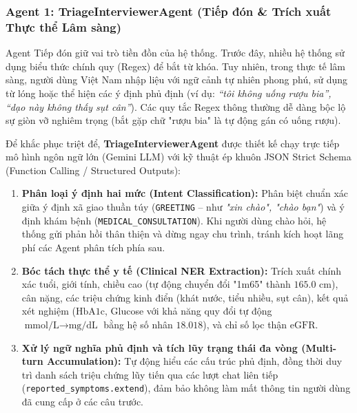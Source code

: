 \documentclass[12pt,a4paper]{article}
\begin{document}
\subsubsection{Agent 1: TriageInterviewerAgent (Tiếp đón \& Trích xuất Thực thể Lâm sàng)}
Agent Tiếp đón giữ vai trò tiền đồn của hệ thống. Trước đây, nhiều hệ thống sử dụng biểu thức chính quy (Regex) để bắt từ khóa. Tuy nhiên, trong thực tế lâm sàng, người dùng Việt Nam nhập liệu với ngữ cảnh tự nhiên phong phú, sử dụng từ lóng hoặc thể hiện các ý định phủ định (ví dụ: \textit{“tôi không uống rượu bia”, “dạo này không thấy sụt cân”}). Các quy tắc Regex thông thường dễ dàng bộc lộ sự giòn vỡ nghiêm trọng (bắt gặp chữ "rượu bia" là tự động gán có uống rượu).

Để khắc phục triệt để, \textbf{TriageInterviewerAgent} được thiết kế chạy trực tiếp mô hình ngôn ngữ lớn (Gemini LLM) với kỹ thuật ép khuôn JSON Strict Schema (Function Calling / Structured Outputs):
\begin{enumerate}[leftmargin=1.2cm]
    \item \textbf{Phân loại ý định hai mức (Intent Classification):} Phân biệt chuẩn xác giữa ý định xã giao thuần túy (\texttt{GREETING} -- như \textit{"xin chào", "chào bạn"}) và ý định khám bệnh (\texttt{MEDICAL\_CONSULTATION}). Khi người dùng chào hỏi, hệ thống gửi phản hồi thân thiện và dừng ngay chu trình, tránh kích hoạt lãng phí các Agent phân tích phía sau.
    \item \textbf{Bóc tách thực thể y tế (Clinical NER Extraction):} Trích xuất chính xác tuổi, giới tính, chiều cao (tự động chuyển đổi "1m65" thành $165.0\text{ cm}$), cân nặng, các triệu chứng kinh điển (khát nước, tiểu nhiều, sụt cân), kết quả xét nghiệm ($\text{HbA1c}$, Glucose với khả năng quy đổi tự động $\text{mmol/L} \to \text{mg/dL}$ bằng hệ số nhân $18.018$), và chỉ số lọc thận $\text{eGFR}$.
    \item \textbf{Xử lý ngữ nghĩa phủ định và tích lũy trạng thái đa vòng (Multi-turn Accumulation):} Tự động hiểu các cấu trúc phủ định, đồng thời duy trì danh sách triệu chứng lũy tiến qua các lượt chat liên tiếp (\texttt{reported\_symptoms.extend}), đảm bảo không làm mất thông tin người dùng đã cung cấp ở các câu trước.
\end{enumerate}
\end{document}
